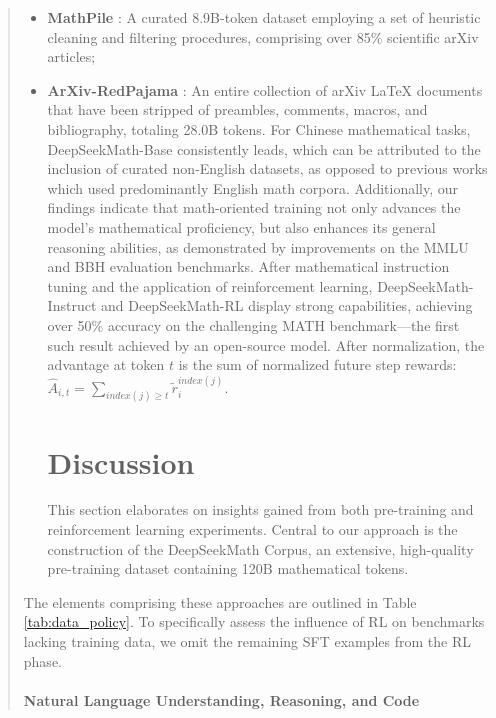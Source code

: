 \begin{itemize}[topsep=0pt]
\begin{itemize}[topsep=0pt]
\begin{itemize}[topsep=0pt]
\begin{abstract}
\begin{itemize}[topsep=0pt]
\begin{itemize}[topsep=0pt]
\begin{algorithm}[t]
\begin{algorithmic}[1]
\begin{itemize}[topsep=0pt]
    \item \textbf{MathPile} \citep{mathpile}: A curated 8.9B-token dataset employing a set of heuristic cleaning and filtering procedures, comprising over 85\% scientific arXiv articles;
    \item \textbf{ArXiv-RedPajama} \citep{redpajama}: An entire collection of arXiv LaTeX documents that have been stripped of preambles, comments, macros, and bibliography, totaling 28.0B tokens. For Chinese mathematical tasks, DeepSeekMath-Base consistently leads, which can be attributed to the inclusion of curated non-English datasets, as opposed to previous works \citep{minerva,llemma} which used predominantly English math corpora. Additionally, our findings indicate that math-oriented training not only advances the model's mathematical proficiency, but also enhances its general reasoning abilities, as demonstrated by improvements on the MMLU \citep{mmlu} and BBH \citep{bbh} evaluation benchmarks. After mathematical instruction tuning and the application of reinforcement learning, DeepSeekMath-Instruct and DeepSeekMath-RL display strong capabilities, achieving over 50\% accuracy on the challenging MATH benchmark—the first such result achieved by an open-source model. After normalization, the advantage at token $t$ is the sum of normalized future step rewards: $\hat{A}_{i, t} = \sum_{index(j) \ge t} \widetilde{r}_i^{index(j)}$. \section{Discussion}
This section elaborates on insights gained from both pre-training and reinforcement learning experiments. Central to our approach is the construction of the DeepSeekMath Corpus, an extensive, high-quality pre-training dataset containing 120B mathematical tokens. \end{itemize}

The elements comprising these approaches are outlined in Table \ref{tab:data_policy}. To specifically assess the influence of RL on benchmarks lacking training data, we omit the remaining SFT examples from the RL phase. \paragraph{Natural Language Understanding, Reasoning, and Code}


\end{algorithmic}
\end{algorithm}
\end{itemize}
\end{itemize}
\end{abstract}
\end{itemize}
\end{itemize}
\end{itemize}
